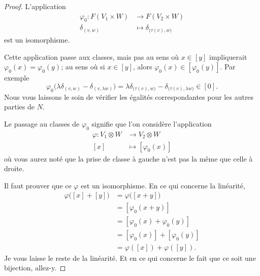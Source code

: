 \begin{proof}
	L'application
	\begin{equation}
		\begin{aligned}
			\varphi_0\colon F(V_1\times W) & \to F(V_2\times W)                     \\
			\delta_{(v,w)}                 & \mapsto \delta_{\big( \tau(v),w \big)}
		\end{aligned}
	\end{equation}
	est un isomorphisme.

	Cette application passe aux classes, mais pas au sens où \( x\in [y]\) impliquerait \( \varphi_0(x)=\varphi_0(y)\); au sens où si \( x\in [y]\), alors \( \varphi_0(x)\in[\varphi_0(y)]\). Par exemple
	\begin{equation}
		\varphi_0\big( \lambda\delta_{(v,w)}-\delta_{(v,\lambda w)} \big)=\lambda\delta_{\big( \tau(v),w \big)}-\delta_{\big( \tau(v),\lambda w \big)}\in [0].
	\end{equation}
	Nous vous laissons le soin de vérifier les égalités correspondantes pour les autres parties de \( N\).

	Le passage au classes de \( \varphi_0\) signifie que l'on considère l'application
	\begin{equation}
		\begin{aligned}
			\varphi\colon V_1\otimes W & \to V_2\otimes W       \\
			[x]                        & \mapsto [\varphi_0(x)]
		\end{aligned}
	\end{equation}
	où vous aurez noté que la prise de classe à gauche n'est pas la même que celle à droite.

	Il faut prouver que ce \( \varphi\) est un isomorphisme. En ce qui concerne la linéarité,
	\begin{subequations}
		\begin{align}
			\varphi\big( [x]+[y] \big) & =\varphi\big( [x+y] \big)      \\
			                           & =[\varphi_0(x+y)]              \\
			                           & =[\varphi_0(x)+\varphi_0(y)]   \\
			                           & =[\varphi_0(x)]+[\varphi_0(y)] \\
			                           & =\varphi([x])+\varphi([y]).
		\end{align}
	\end{subequations}
	Je vous laisse le reste de la linéarité. Et en ce qui concerne le fait que ce soit une bijection, allez-y.
\end{proof}

